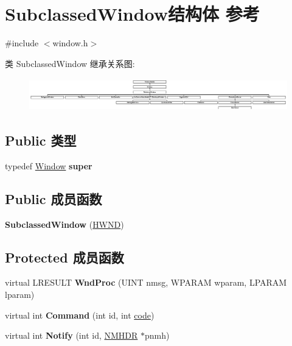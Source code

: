 \hypertarget{struct_subclassed_window}{}\section{Subclassed\+Window结构体 参考}
\label{struct_subclassed_window}


{\ttfamily \#include $<$window.\+h$>$}

类 Subclassed\+Window 继承关系图\+:\begin{figure}[H]
\begin{center}
\leavevmode
\includegraphics[height=1.418919cm]{struct_subclassed_window}
\end{center}
\end{figure}
\subsection*{Public 类型}
\begin{DoxyCompactItemize}
\item 
\mbox{\label{struct_subclassed_window_ab786614dece6229a877491ee63961bdc}} 
typedef \hyperlink{struct_window}{Window} {\bfseries super}
\end{DoxyCompactItemize}
\subsection*{Public 成员函数}
\begin{DoxyCompactItemize}
\item 
\mbox{\label{struct_subclassed_window_a1e7cc512af06231b571eef45cbc95226}} 
{\bfseries Subclassed\+Window} (\hyperlink{interfacevoid}{H\+W\+ND})
\end{DoxyCompactItemize}
\subsection*{Protected 成员函数}
\begin{DoxyCompactItemize}
\item 
\mbox{\label{struct_subclassed_window_a8a7bb2038402e581292e997d3ea79b26}} 
virtual L\+R\+E\+S\+U\+LT {\bfseries Wnd\+Proc} (U\+I\+NT nmsg, W\+P\+A\+R\+AM wparam, L\+P\+A\+R\+AM lparam)
\item 
\mbox{\label{struct_subclassed_window_a1cc674a4a20e28802aaf31e7daf51261}} 
virtual int {\bfseries Command} (int id, int \hyperlink{structcode}{code})
\item 
\mbox{\label{struct_subclassed_window_aa4b2f760e82c4227631282ed3e41d616}} 
virtual int {\bfseries Notify} (int id, \hyperlink{structtag_n_m_h_d_r}{N\+M\+H\+DR} $\ast$pnmh)
\end{DoxyCompactItemize}
